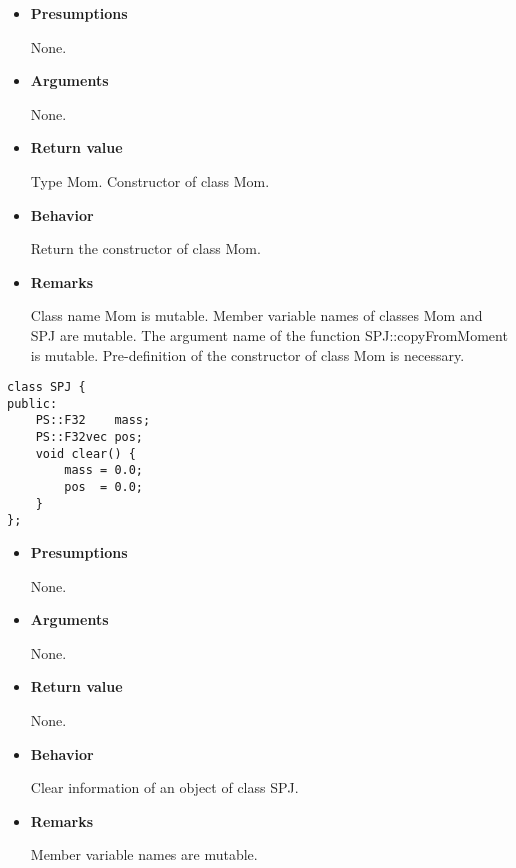 \begin{itemize}

\item {\bf Presumptions}

  None.
  
\item {\bf Arguments}

  None.

\item {\bf Return value}

  Type Mom. Constructor of class Mom.
  
\item {\bf Behavior}

  Return the constructor of class Mom.

\item {\bf Remarks}

  Class name Mom is mutable. Member variable names of classes Mom and
  SPJ are mutable. The argument name of the function
  SPJ::copyFromMoment is mutable. Pre-definition of the constructor of
  class Mom is necessary.

\end{itemize}


\begin{screen}
\begin{verbatim}
class SPJ {
public:
    PS::F32    mass;
    PS::F32vec pos;
    void clear() {
        mass = 0.0;
        pos  = 0.0;
    }
};
\end{verbatim}
\end{screen}

\begin{itemize}

\item {\bf Presumptions}

  None.
  
\item {\bf Arguments}

  None.

\item {\bf Return value}

  None.
  
\item {\bf Behavior}

  Clear information of an object of class SPJ.

\item {\bf Remarks}

  Member variable names are mutable.

\end{itemize}

